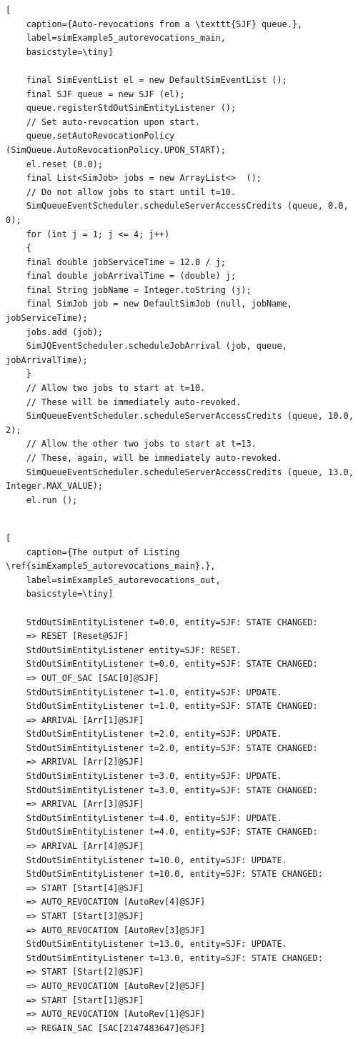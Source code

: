 \begin{lstfloat}
	\begin{lstlisting}[
	caption={Auto-revocations from a \texttt{SJF} queue.},
	label=simExample5_autorevocations_main,
	basicstyle=\tiny]
	
	final SimEventList el = new DefaultSimEventList ();
	final SJF queue = new SJF (el);
	queue.registerStdOutSimEntityListener ();
	// Set auto-revocation upon start.
	queue.setAutoRevocationPolicy (SimQueue.AutoRevocationPolicy.UPON_START);
	el.reset (0.0);
	final List<SimJob> jobs = new ArrayList<>  ();
	// Do not allow jobs to start until t=10.
	SimQueueEventScheduler.scheduleServerAccessCredits (queue, 0.0, 0);
	for (int j = 1; j <= 4; j++)
	{
	final double jobServiceTime = 12.0 / j;
	final double jobArrivalTime = (double) j;
	final String jobName = Integer.toString (j);
	final SimJob job = new DefaultSimJob (null, jobName, jobServiceTime);
	jobs.add (job);
	SimJQEventScheduler.scheduleJobArrival (job, queue, jobArrivalTime);
	}
	// Allow two jobs to start at t=10.
	// These will be immediately auto-revoked.
	SimQueueEventScheduler.scheduleServerAccessCredits (queue, 10.0, 2);
	// Allow the other two jobs to start at t=13.
	// These, again, will be immediately auto-revoked.
	SimQueueEventScheduler.scheduleServerAccessCredits (queue, 13.0, Integer.MAX_VALUE);    
	el.run ();
	
	\end{lstlisting}
\end{lstfloat}

\begin{lstfloat}  
	\begin{lstlisting}[
	caption={The output of Listing \ref{simExample5_autorevocations_main}.},
	label=simExample5_autorevocations_out,
	basicstyle=\tiny]
	
	StdOutSimEntityListener t=0.0, entity=SJF: STATE CHANGED:
	=> RESET [Reset@SJF]
	StdOutSimEntityListener entity=SJF: RESET.
	StdOutSimEntityListener t=0.0, entity=SJF: STATE CHANGED:
	=> OUT_OF_SAC [SAC[0]@SJF]
	StdOutSimEntityListener t=1.0, entity=SJF: UPDATE.
	StdOutSimEntityListener t=1.0, entity=SJF: STATE CHANGED:
	=> ARRIVAL [Arr[1]@SJF]
	StdOutSimEntityListener t=2.0, entity=SJF: UPDATE.
	StdOutSimEntityListener t=2.0, entity=SJF: STATE CHANGED:
	=> ARRIVAL [Arr[2]@SJF]
	StdOutSimEntityListener t=3.0, entity=SJF: UPDATE.
	StdOutSimEntityListener t=3.0, entity=SJF: STATE CHANGED:
	=> ARRIVAL [Arr[3]@SJF]
	StdOutSimEntityListener t=4.0, entity=SJF: UPDATE.
	StdOutSimEntityListener t=4.0, entity=SJF: STATE CHANGED:
	=> ARRIVAL [Arr[4]@SJF]
	StdOutSimEntityListener t=10.0, entity=SJF: UPDATE.
	StdOutSimEntityListener t=10.0, entity=SJF: STATE CHANGED:
	=> START [Start[4]@SJF]
	=> AUTO_REVOCATION [AutoRev[4]@SJF]
	=> START [Start[3]@SJF]
	=> AUTO_REVOCATION [AutoRev[3]@SJF]
	StdOutSimEntityListener t=13.0, entity=SJF: UPDATE.
	StdOutSimEntityListener t=13.0, entity=SJF: STATE CHANGED:
	=> START [Start[2]@SJF]
	=> AUTO_REVOCATION [AutoRev[2]@SJF]
	=> START [Start[1]@SJF]
	=> AUTO_REVOCATION [AutoRev[1]@SJF]
	=> REGAIN_SAC [SAC[2147483647]@SJF]
	
	\end{lstlisting}
\end{lstfloat}

